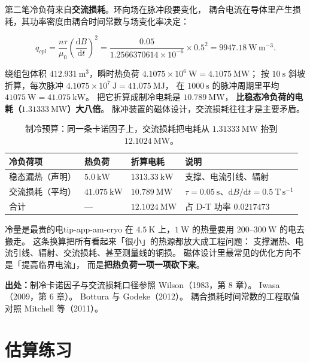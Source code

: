 第二笔冷负荷来自\textbf{交流损耗}。环向场在脉冲段要变化，
耦合电流在导体里产生损耗，其功率密度由耦合时间常数与场变化率决定：

\begin{equation}
q_{cpl}=\frac{n\tau}{\mu_0}\left(\frac{\mathrm{d}B}{\mathrm{d}t}\right)^{2}
=\frac{0.05}{1.2566370614\times10^{-6}}\times0.5^{2}
=9947.18\ \mathrm{W\,m^{-3}}.
\label{eq:app-am-coupling}
\end{equation}

绕组包体积 $412.931\ \mathrm{m^{3}}$，瞬时热负荷 $4.1075\times10^{6}\ \mathrm{W}=4.1075\ \mathrm{MW}$；
按 $10\ \mathrm{s}$ 斜坡折算，每次脉冲 $4.1075\times10^{7}\ \mathrm{J}=41.075\ \mathrm{MJ}$，
在 $1000\ \mathrm{s}$ 的脉冲周期里平均 $41075\ \mathrm{W}=41.075\ \mathrm{kW}$。
把它折算成制冷电耗是 $10.789\ \mathrm{MW}$，
\textbf{比稳态冷负荷的电耗（$1.31333\ \mathrm{MW}$）大八倍}。
脉冲装置的磁体设计，交流损耗往往才是主要矛盾。

\begin{table}[htbp]
\centering
\small
\caption{制冷预算：同一条卡诺因子上，交流损耗把电耗从 $1.31333\ \mathrm{MW}$ 抬到 $12.1024\ \mathrm{MW}$。}
\label{tab:app-am-cryo}
\begin{tabular}{p{3.6cm}p{3.4cm}p{3.4cm}p{3.3cm}}
\toprule
冷负荷项 & 热负荷 & 折算电耗 & 说明 \\
\midrule
稳态漏热（声明） & $5.0\ \mathrm{kW}$ & $1313.33\ \mathrm{kW}$ & 支撑、电流引线、辐射 \\
交流损耗（平均） & $41.075\ \mathrm{kW}$ & $10.789\ \mathrm{MW}$ & $\tau=0.05\ \mathrm{s}$、$\mathrm{d}B/\mathrm{d}t=0.5\ \mathrm{T\,s^{-1}}$ \\
合计 & --- & $12.1024\ \mathrm{MW}$ & 占 D-T 功率 $0.0217473$ \\
\bottomrule
\end{tabular}

\end{table}

\begin{tip}{冷量是最贵的电}{tip-app-am-cryo}
在 $4.5\ \mathrm{K}$ 上，$1\ \mathrm{W}$ 的热量要用 $200$--$300\ \mathrm{W}$ 的电去搬走。
这条换算把所有看起来「很小」的热源都放大成工程问题：
支撑漏热、电流引线、辐射、交流损耗、甚至测量线的铜损。
磁体设计里最常见的优化方向不是「提高临界电流」，
而是\textbf{把热负荷一项一项砍下来}。
\end{tip}

{\footnotesize
\textbf{出处：}制冷卡诺因子与交流损耗口径参照 Wilson（1983，第 8 章）。
Iwasa（2009，第 6 章）。
Bottura 与 Godeke（2012）。
耦合损耗时间常数的工程取值对照 Mitchell 等（2011）。
\section{估算练习}
\label{sec:app-am-problems}
}


